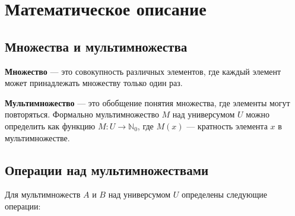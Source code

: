 \documentclass[12pt,a4paper]{article}
\begin{document}
\newpage

\section{Математическое описание}

\subsection{Множества и мультимножества}

\textbf{Множество} — это совокупность различных элементов, где каждый элемент может принадлежать множеству только один раз.

\textbf{Мультимножество} — это обобщение понятия множества, где элементы могут повторяться. Формально мультимножество $M$ над универсумом $U$ можно определить как функцию $M: U \rightarrow \mathbb{N}_0$, где $M(x)$ — кратность элемента $x$ в мультимножестве.

\subsection{Операции над мультимножествами}

Для мультимножеств $A$ и $B$ над универсумом $U$ определены следующие операции:
\end{document}
